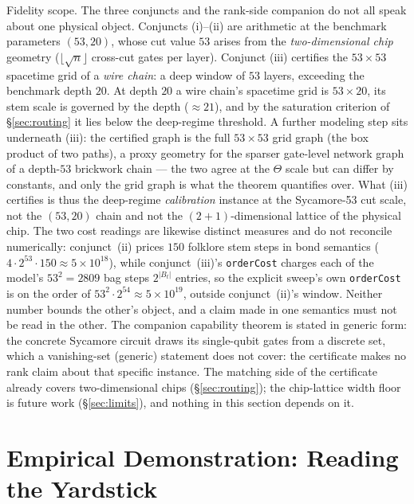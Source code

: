 \documentclass[sigplan,10pt,screen,review,anonymous]{acmart}
\begin{document}
Fidelity scope. The three conjuncts and the rank-side companion do not all speak about one
physical object. Conjuncts (i)--(ii) are arithmetic at the benchmark parameters $(53,20)$, whose
cut value $53$ arises from the \emph{two-dimensional chip} geometry
($\lfloor\sqrt{n}\rfloor$ cross-cut gates per layer). Conjunct (iii) certifies the
$53\times53$ spacetime grid of a \emph{wire chain}: a deep window of $53$ layers,
exceeding the benchmark depth $20$. At depth $20$ a wire chain's spacetime grid is
$53\times20$, its stem scale is governed by the depth ($\approx 21$), and by the
saturation criterion of \S\ref{sec:routing} it lies below the deep-regime threshold. A
further modeling step sits underneath (iii): the certified graph is the full $53\times53$
grid graph (the box product of two paths), a proxy geometry for the sparser gate-level
network graph of a depth-$53$ brickwork chain --- the two agree at the $\Theta$ scale but
can differ by constants, and only the grid graph is what the theorem quantifies over. What
(iii) certifies is thus the deep-regime \emph{calibration} instance at the Sycamore-53 cut
scale, not the $(53,20)$ chain and not the $(2{+}1)$-dimensional lattice of the
physical chip. The two cost readings are likewise distinct measures and do not reconcile
numerically: conjunct~(ii) prices $150$ folklore stem steps in bond semantics
($4\cdot 2^{53}\cdot 150 \approx 5\times 10^{18}$), while conjunct~(iii)'s
\lstinline|orderCost| charges each of the model's $53^2 = 2809$ bag steps $2^{|B_t|}$
entries, so the explicit sweep's own \lstinline|orderCost| is on the order of
$53^2\cdot 2^{54} \approx 5\times 10^{19}$, outside conjunct~(ii)'s window. Neither
number bounds the other's object, and a claim made in one semantics must not be read in the
other. The companion capability theorem is stated in generic form: the concrete Sycamore circuit draws its
single-qubit gates from a discrete set, which a vanishing-set (generic) statement does not
cover: the certificate makes no rank claim about that specific instance. The matching side of
the certificate already covers two-dimensional chips (\S\ref{sec:routing}); the
chip-lattice width floor is future work (\S\ref{sec:limits}), and nothing in this section
depends on it.

\section{Empirical Demonstration: Reading the Yardstick}\label{sec:empirical}
\end{document}
